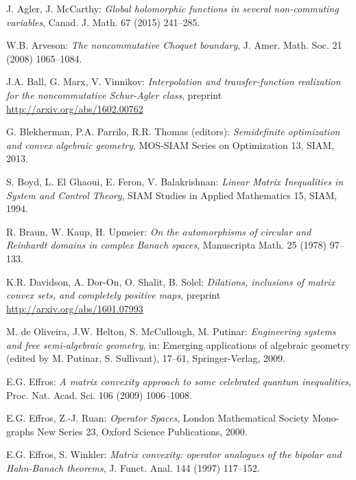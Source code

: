 \documentclass[12pt,makeidx]{amsart}
\numberwithin{equation}{section}
\def\scriptsize{}
\begin{document}
\begin{thebibliography}{69}

\scriptsize

J. Agler, J. McCarthy:
{\it Global holomorphic functions in several non-commuting variables}, {Canad. J. Math.} 67 (2015) 241--285.

W.B. Arveson:
{\it The noncommutative Choquet boundary},
{J. Amer. Math. Soc.}  {21} (2008) 1065--1084.

J.A. Ball, G. Marx, V. Vinnikov:
{\it Interpolation and transfer-function realization for the noncommutative Schur-Agler class},
preprint \url{http://arxiv.org/abs/1602.00762}

G.  Blekherman, P.A. Parrilo, R.R. Thomas (editors):
{\it Semidefinite optimization and convex algebraic geometry},
MOS-SIAM Series on Optimization {13}, SIAM, 2013.

S. Boyd, L. El Ghaoui, E. Feron, V. Balakrishnan:
{\it Linear Matrix Inequalities in System and Control Theory},
SIAM Studies in Applied Mathematics {15}, SIAM, 1994.

 R.  Braun, W.  Kaup, H.  Upmeier: {\it On the automorphisms of circular and Reinhardt domains in complex Banach spaces},  Manuscripta Math. {25} (1978) 97--133. 

K.R. Davidson, A. Dor-On, O. Shalit, B. Solel:
{\it Dilations, inclusions of matrix convex sets, and completely positive maps}, preprint
\url{http://arxiv.org/abs/1601.07993}

M. de Oliveira, J.W. Helton, S. McCullough, M. Putinar: {\it Engineering systems and free semi-algebraic
geometry}, in: {Emerging applications of algebraic geometry} (edited by M. Putinar, S. Sullivant),  17--61, Springer-Verlag, 2009.

E.G. Effros: {\it A matrix convexity approach to some celebrated quantum inequalities},
Proc. Nat. Acad. Sci. 106 (2009) 1006--1008.

E.G. Effros, Z.-J. Ruan:
{\it Operator Spaces}, London Mathematical Society Mono- graphs New Series 23, Oxford Science Publications, 2000.

E.G. Effros, S. Winkler:
{\it Matrix convexity: operator analogues of the bipolar and Hahn-Banach theorems},
{J. Funct. Anal.} {144}  (1997)  117--152.


\end{thebibliography}
\end{document}
